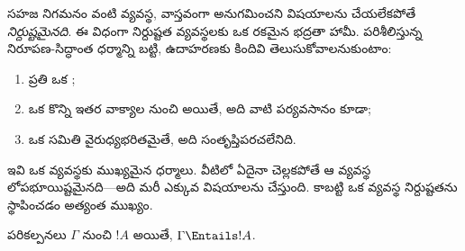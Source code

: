 \documentclass[../../../include/open-logic-section]{subfiles}
\begin{document}
      {}
      {}


\begin{explain}
సహజ నిగమనం వంటి  వ్యవస్థ, వాస్తవంగా అనుగమించని
విషయాలను  చేయలేకపోతే \emph{నిర్దుష్టమైనది}. ఈ విధంగా
నిర్దుష్టత  వ్యవస్థలకు ఒక రకమైన భద్రతా హామీ.
పరిశీలిస్తున్న నిరూపణ-సిద్ధాంత ధర్మాన్ని బట్టి, ఉదాహరణకు
కిందివి తెలుసుకోవాలనుకుంటాం:
\begin{enumerate}
\item ప్రతి   ఒక ;
\item ఒక  కొన్ని ఇతర వాక్యాల నుంచి  అయితే,
  అది వాటి పర్యవసానం కూడా;
\item ఒక  సమితి వైరుధ్యభరితమైతే, అది సంతృప్తిపరచలేనిది.
\end{enumerate}
ఇవి ఒక  వ్యవస్థకు ముఖ్యమైన ధర్మాలు. వీటిలో ఏదైనా
చెల్లకపోతే ఆ  వ్యవస్థ లోపభూయిష్టమైనది---అది మరీ ఎక్కువ
విషయాలను  చేస్తుంది. కాబట్టి ఒక  వ్యవస్థ
నిర్దుష్టతను స్థాపించడం అత్యంత ముఖ్యం.
\end{explain}

\begin{thm}[నిర్దుష్టత]
 పరికల్పనలు $\Gamma$ నుంచి $!A$  అయితే,
$\Gamma \Entails !A$.
\end{thm}
\end{document}
